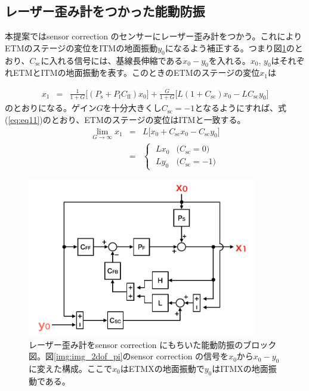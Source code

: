 \documentclass[a4paper,12pt]{jsarticle}
\begin{document}
\subsection{レーザー歪み計をつかった能動防振}

本提案ではsensor correction のセンサーにレーザー歪み計をつかう。これによりETMのステージの変位をITMの地面振動$y_0$になるよう補正する。つまり図\ref{img:img_pi_etmx}のとおり、$C_{\mathrm{sc}}$に入れる信号には、基線長伸縮である$x_0-y_0$を入れる。$x_0,\, y_0$はそれぞれETMとITMの地面振動を表す。このときのETMのステージの変位$x_1$は

\begin{eqnarray}
  x_1 &=& \frac{1}{1+G}\Biggl[(P_{\mathrm{s}}+P_{\mathrm{f}}C_{\mathrm{ff}})x_0\Biggl]
  + \frac{G}{1+G}\Biggl[L(1+C_{\mathrm{sc}})x_0 - LC_{\mathrm{sc}}y_0\Biggl]
\end{eqnarray}
のとおりになる。ゲイン$G$を十分大きくし$C_{\mathrm{sc}}=-1$となるようにすれば、式(\ref{eq:eq11})のとおり、ETMのステージの変位はITMと一致する。
\begin{eqnarray}\label{eq:eq10}
  \lim_{G \to \infty} x_{1} &=& L\Biggl[x_0+C_{\mathrm{sc}}x_0-C_{\mathrm{sc}}y_0\Biggl] \\
  &=&  
  \begin{cases}\label{eq:eq11}
    \; Lx_{0} & \text{($C_{\mathrm{sc}}=0$)} \\
    \; Ly_{0} & \text{($C_{\mathrm{sc}}=-1$)} 
  \end{cases}  
\end{eqnarray}


\begin{figure}[H]
  \begin{center}
    \includegraphics[width=10.0cm]{./img_pi_etmx.png}
  \end{center}
  \caption{レーザー歪み計をsensor correction にもちいた能動防振のブロック図。図\ref{img:img_2dof_pi}のsensor correction の信号を$x_0$から$x_0-y_0$に変えた構成。ここで$x_0$はETMXの地面振動で$y_0$はITMXの地面振動である。}\label{img:img_pi_etmx}
\end{figure}
\end{document}
